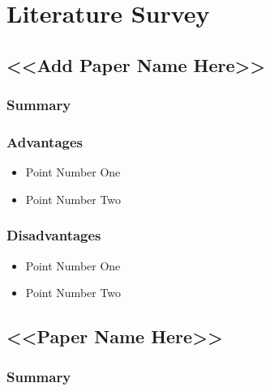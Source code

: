 \chapter{Literature Survey}

\section[<<Short Name>>]{<<Add Paper Name Here>>}

\subsection{Summary}


\subsection{Advantages}

\begin{itemize}
\item{Point Number One}
\item{Point Number Two}
\end{itemize}

\subsection{Disadvantages}

\begin{itemize}
\item{Point Number One}
\item{Point Number Two}
\end{itemize}


\section{<<Paper Name Here>>}
\subsection{Summary}

